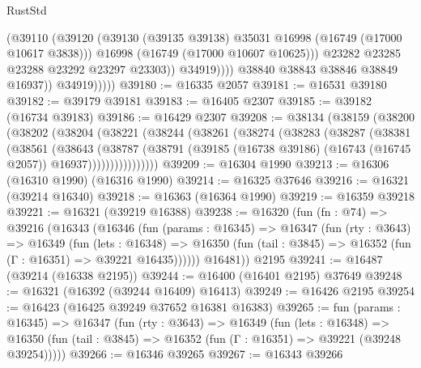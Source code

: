 \begin{lexlean}{RustStd}
\begin{coremodule}
                            (@39110
                              (@39120
                                (@39130
                                  (@39135 @39138)
                                  @35031
                                  @16998
                                  (@16749 (@17000 @10617 @3838)))
                                @16998
                                (@16749 (@17000 @10607 @10625)))
                              @23282
                              @23285
                              @23288
                              @23292
                              @23297
                              @23303))
                          @34919))))
                  @38840
                  @38843
                  @38846
                  @38849
                  @16937))
              @34919)))))
@39180 := @16335 @2057
@39181 := @16531 @39180
@39182 := @39179 @39181
@39183 := @16405 @2307
@39185 := @39182 (@16734 @39183)
@39186 := @16429 @2307
@39208 := @38134
    (@38159
      (@38200
        (@38202
          (@38204
            (@38221
              (@38244
                (@38261
                  (@38274
                    (@38283
                      (@38287
                        (@38381
                          (@38561
                            (@38643
                              (@38787
                                (@38791
                                  (@39185
                                    (@16738 @39186)
                                    (@16743 (@16745 @2057))
                                    @16937))))))))))))))))
@39209 := @16304 @1990
@39213 := @16306 (@16310 @1990) (@16316 @1990)
@39214 := @16325 @37646
@39216 := @16321 (@39214 @16340)
@39218 := @16363 (@16364 @1990)
@39219 := @16359 @39218
@39221 := @16321 (@39219 @16388)
@39238 := @16320
    (fun (fn : @74) =>
    @39216
      (@16343
        (@16346
          (fun (params : @16345) =>
          @16347
            (fun (rty : @3643) =>
            @16349
              (fun (lets : @16348) =>
              @16350 (fun (tail : @3845) => @16352 (fun (Γ : @16351) => @39221 @16435))))))
        @16481))
    @2195
@39241 := @16487 (@39214 (@16338 @2195))
@39244 := @16400 (@16401 @2195) @37649
@39248 := @16321 (@16392 (@39244 @16409) @16413)
@39249 := @16426 @2195
@39254 := @16423 (@16425 @39249 @37652 @16381 @16383)
@39265 := fun (params : @16345) =>
  @16347
    (fun (rty : @3643) =>
    @16349
      (fun (lets : @16348) =>
      @16350 (fun (tail : @3845) => @16352 (fun (Γ : @16351) => @39221 (@39248 @39254)))))
@39266 := @16346 @39265
@39267 := @16343 @39266

\end{coremodule}
\end{lexlean}
